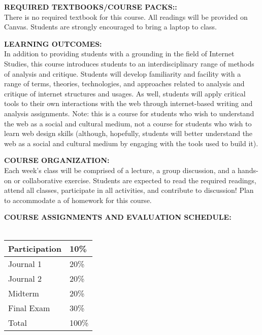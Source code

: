 \documentclass[10pt]{article}
\begin{document}
\textbf{REQUIRED TEXTBOOKS/COURSE PACKS::}\\
There is no required textbook for this course. All readings will be provided on Canvas. Students are strongly encouraged to bring a laptop to class. 

\textbf{LEARNING OUTCOMES:}\\
In addition to providing students with a grounding in the field of Internet Studies, this course introduces students to an interdisciplinary range of methods of analysis and critique. Students will develop familiarity and facility with a range of terms, theories, technologies, and approaches related to analysis and critique of internet structures and usages. As well, students will apply critical tools to their own interactions with the web through internet-based writing and analysis assignments. Note: this is a course for students who wish to understand the web as a social and cultural medium, not a course for students who wish to learn web design skills (although, hopefully, students will better understand the web as a social and cultural medium by engaging with the tools used to build it). 

\textbf{COURSE ORGANIZATION:}\\
Each week's class will be comprised of a lecture, a group discussion, and a hands-on or collaborative exercise. Students are expected to read the required readings, attend all classes, participate in all activities, and contribute to discussion! Plan to accommodate a \underline{} of homework for this course. 

\textbf{COURSE ASSIGNMENTS AND EVALUATION SCHEDULE:}\\\\
\begin{tabular}{|l|l|}\hline
Participation & 10\% \\\hline
Journal 1 & 20\% \\\hline
Journal 2 & 20\% \\\hline
Midterm & 20\% \\\hline
Final Exam & 30\% \\\hline\hline
Total & 100\% \\\hline
\end{tabular}
\end{document}
